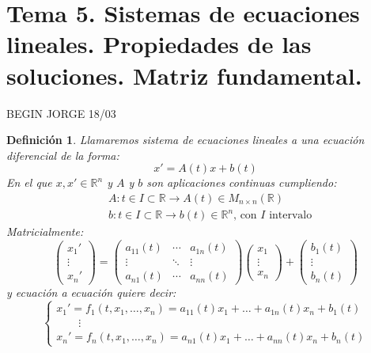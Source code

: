 \documentclass{article}
\theoremstyle{theorem-style}  %
\theoremstyle{definition-style}
\newtheorem{definition}{Definición}[section]
\theoremstyle{example-style}
\begin{document}
\section{Tema 5. Sistemas de ecuaciones lineales. Propiedades de las soluciones. Matriz fundamental.}
BEGIN JORGE 18/03 \\
\begin{definition}
	Llamaremos \emph{sistema de ecuaciones lineales} a una ecuación diferencial de la forma:
	\[x'= A(t)x + b(t)\]
	En el que $ x,x'\in \mathbb{R}^n $ y $A$ y $b$ son aplicaciones continuas cumpliendo:\\
	\begin{align*}
	&A: t \in I \subset \mathbb{R} \longrightarrow A(t) \in M_{n \times n}(\mathbb{R}) \\ 
	&b: t \in I \subset \mathbb{R} \longrightarrow b(t) \in \mathbb{R}^n \text{, con $I$ intervalo}
	\end{align*}
	Matricialmente:
	\[ \begin{pmatrix}
	x_1' \\
	\vdots \\
	x_n'  
	\end{pmatrix} = \begin{pmatrix}
	a_{11}(t) & \cdots & a_{1n}(t) \\
	\vdots & \ddots & \vdots \\
	a_{n1}(t) & \cdots & a_{nn}(t)
	\end{pmatrix} \begin{pmatrix}
	x_1 \\
	\vdots \\
	x_n
	\end{pmatrix} + \begin{pmatrix}
	b_1(t) \\
	\vdots \\
	b_n(t)
	\end{pmatrix}\]
	y ecuación a ecuación quiere decir:
	\[\begin{cases}
	x_1' = f_1(t, x_1, \dots, x_n)=a_{11}(t)x_1+\dots+a_{1n}(t)x_n+b_1(t) \\
	\qquad \vdots \\
	x_n' = f_n(t, x_1, \dots, x_n)=a_{n1}(t)x_1+\dots+a_{nn}(t)x_n+b_n(t) 
	\end{cases}\]
\end{definition}
\end{document}

